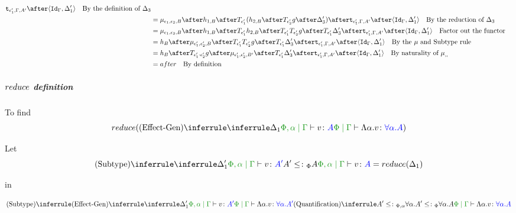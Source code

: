 \documentclass{report}
\begin{document}
\begin{align*}
                    \tstrength{\e_1'}{\G}{A'}\after\pr{\idg}{\D_1'}\qt{By the definition of $\D_3$}\\
                    &= \bind{\e_1}{\e_2}{B}\after 
                    h_{1, B}\after\T{\e_1'}{(h_{2, B}\after\T{\e_2'}{g}\after \D_3')}\after
                    \tstrength{\e_1'}{\G}{A'}\after\pr{\idg}{\D_1'}\qt{By the reduction of $\D_3$}\\
                    &= \bind{\e_1}{\e_2}{B}\after 
                    h_{1, B}\after\T{\e_1'}{h_{2, B}}\after\T{\e_1'}{\T{\e_2'}{g}}\after \T{\e_1'}{\D_3'}\after
                    \tstrength{\e_1'}{\G}{A'}\after\pr{\idg}{\D_1'}\qt{Factor out the functor}\\
                    &= h_B\after\bind{\e_1'}{\e_2'}{B}\after\T{\e_1'}{\T{\e_2'}{g}}\after \T{\e_1'}{\D_3'}\after
                    \tstrength{\e_1'}{\G}{A'}\after\pr{\idg}{\D_1'}\qt{By the $\mu$ and Subtype rule }\\
                    & = h_B\after\T{\e_1'\dot\e_2'}{g}\after\bind{\e_1'}{\e_2'}{B'}\after \T{\e_1'}{\D_3'}\after
                    \tstrength{\e_1'}{\G}{A'}\after\pr{\idg}{\D_1'}\qt{By naturality of $\bind{}{}{}$ }\\
                    & = after \qt{By definition}
                \end{align*}

        \subparagraph{$reduce$ definition}

        
        To find 
        \begin{equation}
            \reduce(\ntreeruleI{Effect-Gen}{\treeruleI{\D_1}{\etyperelation{\P,\a}{\G}{v}{A}}}{\gpetyperelation{\elam{\a}{v}}{\all{\a}{A}}})
        \end{equation}

        Let
        \begin{equation}
            \ntreeruleII{Subtype}{\treeruleI{\D_1'}{\etyperelation{\P,\a}{\G}{v}{A'}}}{ A'\subtypep A}{\etyperelation{\P,\a}{\G}{v}{A}} = \reduce(\D_1)
        \end{equation}

        in 

        \begin{equation}
            \ntreeruleII{Subtype}{
                \ntreeruleI{Effect-Gen}{
                    \treeruleI{\D_1'}{\etyperelation{\P,\a}{\G}{v}{A'}}
                }{
                    \gpetyperelation{\elam{\a}{v}}{\all{\a}{A'}}
                }
            }{ 
            \ntreeruleI{Quantification}{A' \subtypepa}{\all{\a}{A'} \subtypep \all{\a}{A}}
            }{
                \gpetyperelation{\elam{\a}{v}}{\all{\a}{A}}
            }
        \end{equation}
\end{document}
